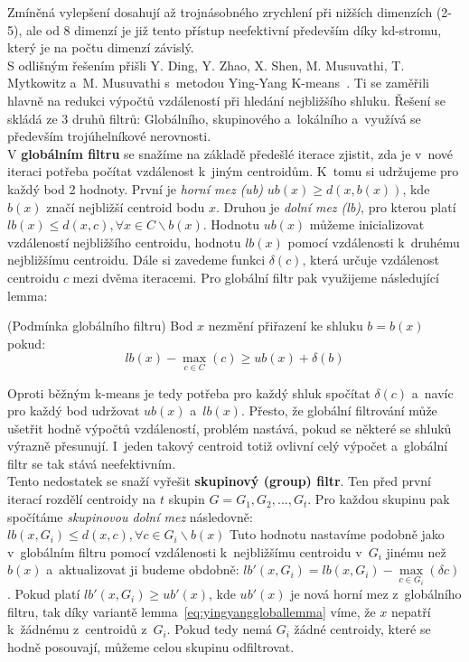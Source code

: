 Zmíněná vylepšení dosahují až trojnásobného zrychlení při nižších dimenzích (2-5), ale od 8 dimenzí je již tento přístup neefektivní především díky kd-stromu, který je na počtu dimenzí závislý.\\

S odlišným řešením přišli Y. Ding, Y. Zhao,  X. Shen, M. Musuvathi, T. Mytkowitz a~M. Musuvathi s~metodou Ying-Yang K-means~\cite{ding15}. Ti se zaměřili hlavně na redukci výpočtů vzdáleností při hledání nejbližšího shluku. Řešení se skládá ze 3 druhů filtrů: Globálního, skupinového a~lokálního a~využívá se především trojúhelníkové nerovnosti.\\

V \textbf{globálním filtru} se snažíme na základě předešlé iterace zjistit, zda je v~nové iteraci potřeba počítat vzdálenost k~jiným centroidům. K~tomu si udržujeme pro každý bod 2 hodnoty. První je \textit{horní mez (ub)} $ub(x) \ge d(x,b(x))$, kde $b(x)$ značí nejbližší centroid bodu $x$. Druhou je \textit{dolní mez (lb)}, pro kterou platí $lb(x) \le d(x,c), \forall x \in C\backslash b(x)$. Hodnotu $ub(x)$ můžeme inicializovat vzdáleností nejbližšího centroidu, hodnotu $lb(x)$ pomocí vzdálenosti k~druhému nejbližšímu centroidu. Dále si zavedeme funkci $\delta(c)$, která určuje vzdálenost centroidu $c$ mezi dvěma iteracemi. Pro globální filtr pak využijeme následující lemma:
\begin{lemma}\label{eq:yingyanggloballemma}
(Podmínka globálního filtru) Bod $x$ nezmění přiřazení ke shluku $b = b(x)$ pokud:
$$lb(x) - \max\limits_{c\in C}(c) \ge ub(x) + \delta(b)$$
\end{lemma}
Oproti běžným k-means je tedy potřeba pro každý shluk spočítat $\delta(c)$ a~navíc pro každý bod udržovat $ub(x)$ a~$lb(x)$. Přesto, že globální filtrování může ušetřit hodně výpočtů vzdáleností, problém nastává, pokud se některé se shluků výrazně přesunují. I~jeden takový centroid totiž ovlivní celý výpočet a~globální filtr se tak stává neefektivním.\\

Tento nedostatek se snaží vyřešit \textbf{skupinový (group) filtr}. Ten před první iterací rozdělí centroidy na $t$ skupin $G={G_1,G_2,...,G_t}$. Pro každou skupinu pak spočítáme \textit{skupinovou dolní mez} následovně: $lb(x,G_i) \le d(x,c), \forall c \in G_i \backslash b(x)$ Tuto hodnotu nastavíme podobně jako v~globálním filtru pomocí vzdálenosti k~nejbližšímu centroidu v~$G_i$ jinému než $b(x)$ a~aktualizovat ji budeme obdobně: $lb'(x,G_i)=lb(x,G_i)-\max\limits_{c \in G_i}(\delta c)$. Pokud platí $lb'(x,G_i)\ge ub'(x)$, kde $ub'(x)$ je nová horní mez z~globálního filtru, tak díky variantě lemma~\ref{eq:yingyanggloballemma} víme, že $x$ nepatří k~žádnému z~centroidů z~$G_i$. Pokud tedy nemá $G_i$ žádné centroidy, které se hodně posouvají, můžeme celou skupinu odfiltrovat.\\

